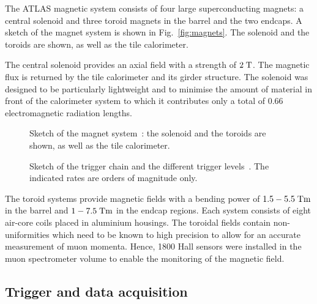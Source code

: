 The ATLAS magnetic system consists of four large superconducting magnets: a central solenoid and three toroid magnets in the barrel and the
two endcaps.
A sketch of the magnet system is shown in Fig.~\ref{fig:magnets}.
The solenoid and the toroids are shown, as well as the tile calorimeter.

The central solenoid provides an axial field with a strength of \mbox{$2 \; \mathrm{T}$}.
The magnetic flux is returned by the tile calorimeter and its girder structure.
The solenoid was designed to be particularly lightweight and to minimise the amount of material in front of the calorimeter system
to which it contributes only a total of 0.66 electromagnetic radiation lengths.

\begin{figure}[h]
\centering
  \begin{minipage}[t][0.55\textwidth][b]{0.45\textwidth}
  \caption[Sketch of the magnet system]{
    Sketch of the magnet system~\cite{detectorpaper}:
    the solenoid and the toroids are shown, as well as the tile calorimeter.}
  \label{fig:magnets}
  \end{minipage}
  \hspace{1cm}
  \begin{minipage}[t][0.55\textwidth][b]{0.45\textwidth}
  \caption[Sketch of the trigger chain]{
    Sketch of the trigger chain and the different trigger levels~\cite{ATLASTDR}.
    The indicated rates are orders of magnitude only.
  }
  \label{fig:triggerdaq}
  \end{minipage}
\end{figure}

The toroid systems provide magnetic fields with a bending power of \mbox{$1.5 - 5.5 \; \mathrm{Tm}$} in the barrel and \mbox{$1 - 7.5 \; \mathrm{Tm}$} in the endcap regions.
Each system consists of eight air-core coils placed in aluminium housings.
The toroidal fields contain non-uniformities which need to be known to high precision to allow for an accurate measurement of muon momenta.
Hence, 1800 Hall sensors were installed in the muon spectrometer volume to enable the monitoring of the magnetic field.


\subsection{Trigger and data acquisition}
\label{sec:triggerDAQ}


